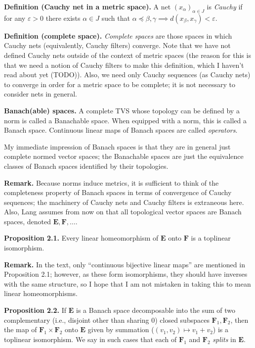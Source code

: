 \documentclass[a4paper]{article}
\begin{document}
\textbf{Definition (Cauchy net in a metric space).} A net $(x_\alpha)_{\alpha \in J}$ is \emph{Cauchy} if for any $\varepsilon > 0$ there exists $\alpha \in J$ such that $\alpha \preceq \beta, \gamma \implies d(x_\beta, x_\gamma) < \varepsilon$.

\textbf{Definition (complete space).} \emph{Complete spaces} are those spaces in which Cauchy nets (equivalently, Cauchy filters) converge. Note that we have not defined Cauchy nets outside of the context of metric spaces (the reason for this is that we need a notion of Cauchy filters to make this definition, which I haven't read about yet (TODO)). Also, we need only Cauchy sequences (as Cauchy nets) to converge in order for a metric space to be complete; it is not necessary to consider nets in general.

\textbf{Banach(able) spaces.} A complete TVS whose topology can be defined by a norm is called a Banachable space. When equipped with a norm, this is called a Banach space. Continuous linear maps of Banach spaces are called \emph{operators}.

My immediate impression of Banach spaces is that they are in general just complete normed vector spaces; the Banachable spaces are just the equivalence classes of Banach spaces identified by their topologies.

\textbf{Remark.} Because norms induce metrics, it is sufficient to think of the completeness property of Banach spaces in terms of convergence of Cauchy sequences; the machinery of Cauchy nets and Cauchy filters is extraneous here. Also, Lang assumes from now on that all topological vector spaces are Banach spaces, denoted $\mathbf{E}, \mathbf{F}, \ldots$.

\textbf{Proposition 2.1.} Every linear homeomorphism of $\mathbf{E}$ onto $\mathbf{F}$ is a toplinear isomorphism.

\textbf{Remark.} In the text, only ``continuous bijective linear maps'' are mentioned in Proposition 2.1; however, as these form isomorphisms, they should have inverses with the same structure, so I hope that I am not mistaken in taking this to mean linear homeomorphisms.

\textbf{Proposition 2.2.} If $\mathbf{E}$ is a Banach space decomposable into the sum of two complementary (i.e., disjoint other than sharing $0$) closed subspaces $\mathbf{F}_1, \mathbf{F}_2$, then the map of $\mathbf{F}_1 \times \mathbf{F}_2$ onto $\mathbf{E}$ given by summation ($(v_1, v_2) \mapsto v_1 + v_2$) is a toplinear isomorphism. We say in such cases that each of $\mathbf{F}_1$ and $\mathbf{F}_2$ \emph{splits} in $\mathbf{E}$.
\end{document}
